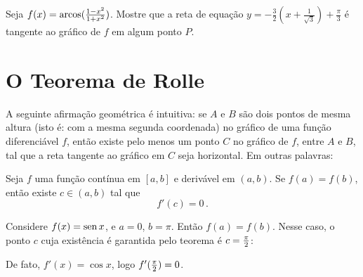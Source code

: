 \begin{exo}
Seja $f(x)=\operatorname{arcos}(\frac{1-x^2}{1+x^2})$. Mostre que a reta 
de equação $y=-\frac{3}{2}(x+\frac{1}{\sqrt{3}})+\frac{\pi}{3}$
é tangente ao gráfico de $f$ em algum ponto $P$.
\end{exo}

\section{O Teorema de Rolle}
A seguinte afirmação geométrica é intuitiva:
se $A$ e $B$ são dois pontos de mesma altura (isto é: com a mesma segunda
coordenada) no gráfico de
uma função diferenciável $f$, então existe pelo menos um ponto $C$ no gráfico
de $f$, entre $A$ e $B$, tal que a reta tangente ao gráfico 
em $C$ seja horizontal.
Em outras palavras: 
\begin{teo}\label{Teo:Rolle}
Seja $f$ uma função contínua em $[a,b]$ e derivável em $(a,b)$. Se
$f(a)=f(b)$, então
existe $c\in (a,b)$ tal que $$f'(c)=0\,.$$
\end{teo}

\begin{ex}
Considere $f(x)=\operatorname{sen} x$, e $a=0$, $b=\pi$. Então $f(a)=f(b)$. Nesse caso, o
ponto $c$ cuja existência é garantida pelo teorema é
$c=\tfrac{\pi}{2}$:
\begin{center}
\begin{bmlimage}\end{bmlimage}
\end{center}
De fato, $f'(x)=\cos x$, logo $f'(\tfrac{\pi}{2})=0$.
\end{ex}

